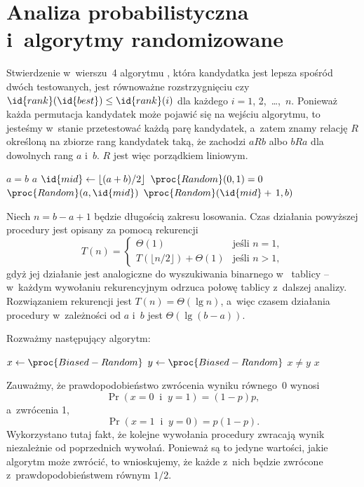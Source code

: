 \chapter{Analiza probabilistyczna i~algorytmy randomizowane}


\exercise %
Stwierdzenie w~wierszu~4 algorytmu , która kandydatka jest lepsza spośród dwóch testowanych, jest równoważne rozstrzygnięciu czy $\id{rank}(\id{best})\le\id{rank}(i)$ dla każdego $i=1$, 2,~\dots,~$n$. Ponieważ każda permutacja kandydatek może pojawić się na wejściu algorytmu, to jesteśmy w~stanie przetestować każdą parę kandydatek, a~zatem znamy relację $R$ określoną na zbiorze rang kandydatek taką, że zachodzi $aRb$ albo $bRa$ dla dowolnych rang $a$ i~$b$. $R$ jest więc porządkiem liniowym.

\exercise %
\begin{codebox}
\li	\If $a=b$
\li		\Then \Return $a$
		\End
\li	$\id{mid}\gets\lfloor(a+b)/2\rfloor$
\li	\If $\proc{Random}(0,1)=0$
\li		\Then \Return $\proc{Random}(a,\id{mid})$
\li		\Else \Return $\proc{Random}(\id{mid}+\,1,b)$
		\End
\end{codebox}
Niech $n=b-a+1$ będzie długością zakresu losowania. Czas działania powyższej procedury jest opisany za pomocą rekurencji
\[
	T(n) =
	\begin{cases}
		\Theta(1) & \text{jeśli $n=1$}, \\
		T(\lfloor n/2\rfloor)+\Theta(1) & \text{jeśli $n>1$},
	\end{cases}
\]
gdyż jej działanie jest analogiczne do wyszukiwania binarnego w~ tablicy -- w~każdym wywołaniu rekurencyjnym odrzuca połowę tablicy z~dalszej analizy. Rozwiązaniem rekurencji jest $T(n)=\Theta(\lg n)$, a~więc czasem działania procedury  w~zależności od $a$ i~$b$ jest $\Theta(\lg(b-a))$.

\exercise %
Rozważmy następujący algorytm:
\begin{codebox}
\li	\Repeat
		$x\gets\proc{Biased-Random}$
\li		$y\gets\proc{Biased-Random}$
\li	\Until $x\ne y$ \label{li:unbiased-repeat-end}
\li \Return $x$
\end{codebox}
Zauważmy, że prawdopodobieństwo zwrócenia wyniku równego~0 wynosi
\[
	\Pr(x=0\;\;\text{i}\;\;y=1) = (1-p)p,
\]
a~zwrócenia 1,
\[
	\Pr(x=1\;\;\text{i}\;\;y=0) = p(1-p).
\]
Wykorzystano tutaj fakt, że kolejne wywołania procedury  zwracają wynik niezależnie od poprzednich wywołań. Ponieważ są to jedyne wartości, jakie algorytm może zwrócić, to wnioskujemy, że każde z~nich będzie zwrócone z~prawdopodobieństwem równym $1/2$.

